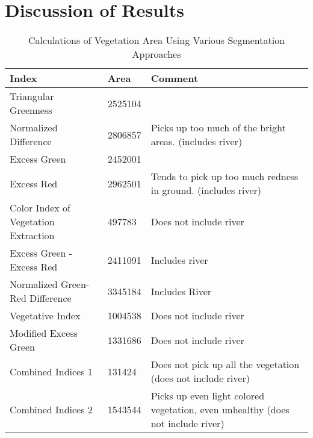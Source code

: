 \documentclass[letterpaper]{article}
\begin{document}
{\section{Discussion of Results}


{\renewcommand{\arraystretch}{2}%
\begin{table}[H]
    \caption{Calculations of Vegetation Area Using Various Segmentation Approaches}
    \label{fig:calculations}
    \begin{tabular}{  l  p{4cm}  p{5cm} }
        \toprule
\textbf{Index}      
& \textbf{Area}   
& \textbf{Comment} \\\midrule
Triangular Greenness
&  2525104
& \\\hline
Normalized Difference     
&   2806857
&   Picks up too much of the bright areas. (includes river)\\\hline
Excess Green      
& 2452001
& \\\hline
Excess Red      
& 2962501
&  Tends to pick up too much redness in ground. (includes river)\\\hline
Color Index of Vegetation Extraction      
& 497783
& Does not include river\\\hline
Excess Green - Excess Red   
& 2411091
& Includes river \\\hline
Normalized Green-Red Difference    
& 3345184
& Includes River\\\hline
Vegetative Index      
& 1004538
& Does not include river\\\hline
Modified Excess Green      
& 1331686
& Does not include river\\\hline
Combined Indices 1  
&  131424
& Does not pick up all the vegetation (does not include river)\\\hline    
Combined Indices 2      
&  1543544
& Picks up even light colored vegetation, even unhealthy (does not include river)\\\hline    

        \bottomrule
    \end{tabular}
\end{table}

}}
\end{document}

